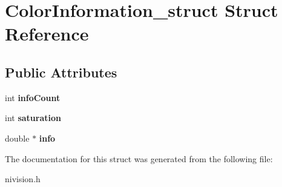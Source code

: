 \hypertarget{structColorInformation__struct}{
\section{ColorInformation\_\-struct Struct Reference}
\label{structColorInformation__struct}
}
\subsection*{Public Attributes}
\begin{DoxyCompactItemize}
\item 
\hypertarget{structColorInformation__struct_a25765595c2b67369571ffe3ec0074c9a}{
int {\bfseries infoCount}}
\label{structColorInformation__struct_a25765595c2b67369571ffe3ec0074c9a}

\item 
\hypertarget{structColorInformation__struct_a0ec043e4fbe310d8a1d0b8f97f00286b}{
int {\bfseries saturation}}
\label{structColorInformation__struct_a0ec043e4fbe310d8a1d0b8f97f00286b}

\item 
\hypertarget{structColorInformation__struct_ae1c85ff3a60ad26918b15aee6186bc1a}{
double $\ast$ {\bfseries info}}
\label{structColorInformation__struct_ae1c85ff3a60ad26918b15aee6186bc1a}

\end{DoxyCompactItemize}


The documentation for this struct was generated from the following file:\begin{DoxyCompactItemize}
\item 
nivision.h\end{DoxyCompactItemize}
